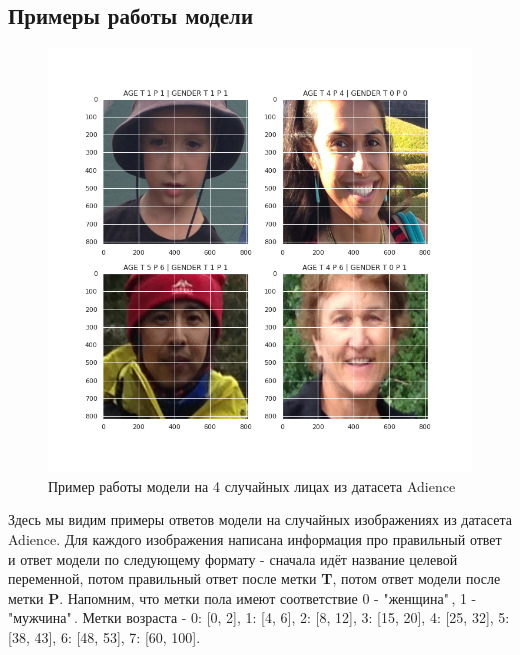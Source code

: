 \subsection{Примеры работы модели}\label{subsec:примеры-работы-модели2}
\begin{figure}[h]
    \center
    \includegraphics[width=0.9\linewidth]{images/image.png}
    \caption{Пример работы модели на 4 случайных лицах из датасета Adience}
    \label{ris:images/image.png}
\end{figure}
Здесь мы видим примеры ответов модели на случайных изображениях из датасета Adience.
Для каждого изображения написана информация про правильный ответ и ответ модели по следующему формату -
сначала идёт название целевой переменной, потом правильный ответ после метки \textbf{T}, потом ответ модели после метки \textbf{P}.
Напомним, что метки пола имеют соответствие 0 - "женщина"\,, 1 - "мужчина"\,.
Метки возраста - 0: [0, 2], 1: [4, 6], 2: [8, 12], 3: [15, 20], 4: [25, 32], 5: [38, 43], 6: [48, 53], 7: [60, 100].